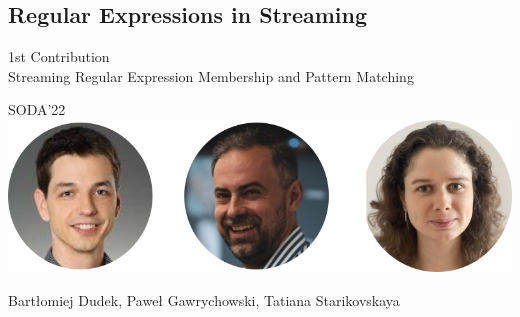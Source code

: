 \subsection{Regular Expressions in Streaming}
\begin{frame}
  \centering
  {\large 1st Contribution}\\
  \medskip
  {\Large Streaming Regular Expression Membership and Pattern Matching}

  \bigskip
  {\large SODA'22}\\
  \bigskip
  \includegraphics{pictures/mindmap/regexp.png}

  \bigskip
  Bartłomiej Dudek, Paweł Gawrychowski, Tatiana Starikovskaya
\end{frame}


